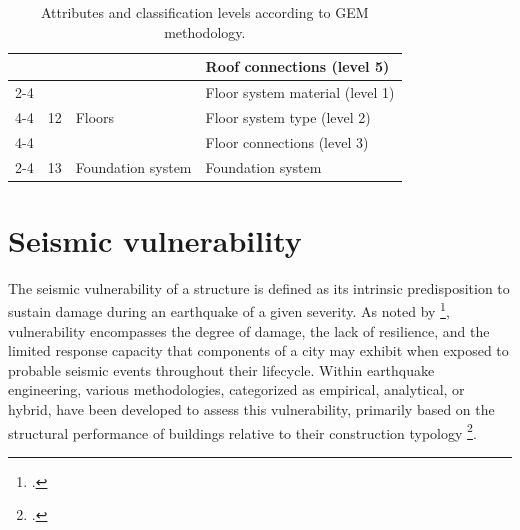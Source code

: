\begin{refsection}
\begin{table}[htbp]
\begin{tabular}{|l|l|l|l|}
    &                     &                                                                                                                 & Roof connections (level 5)                                                         \\ \cline{2-4} 
    & \multirow{3}{*}{12} & \multirow{3}{*}{Floors}                                                                                         & Floor system material (level 1)                                                    \\ \cline{4-4} 
    &                     &                                                                                                                 & Floor system type (level 2)                                                        \\ \cline{4-4} 
    &                     &                                                                                                                 & Floor connections (level 3)                                                        \\ \cline{2-4} 
    & 13                  & Foundation system                                                                                               & Foundation system                                                                  \\ \hline
\end{tabular}
\caption{Attributes and classification levels according to GEM methodology.}
\label{tab:GEM_attributes}
\end{table}

\renewcommand{\sectionnametext}{Seismic vulnerability}
\renewcommand{\headingtextR}{\thesection. \sectionnametext}
\section{\sectionnametext}
\label{sec:seismic_vulnerability}

The seismic vulnerability of a structure is defined as its intrinsic predisposition to sustain damage during an earthquake of a given severity. As noted by \footcite{barbat_seismic_2010}, vulnerability encompasses the degree of damage, the lack of resilience, and the limited response capacity that components of a city may exhibit when exposed to probable seismic events throughout their lifecycle. Within earthquake engineering, various methodologies, categorized as empirical, analytical, or hybrid, have been developed to assess this vulnerability, primarily based on the structural performance of buildings relative to their construction typology \footcite{martinez-cuevas_urban_2014, yepes-estrada_modeling_2017}.


\end{refsection}
